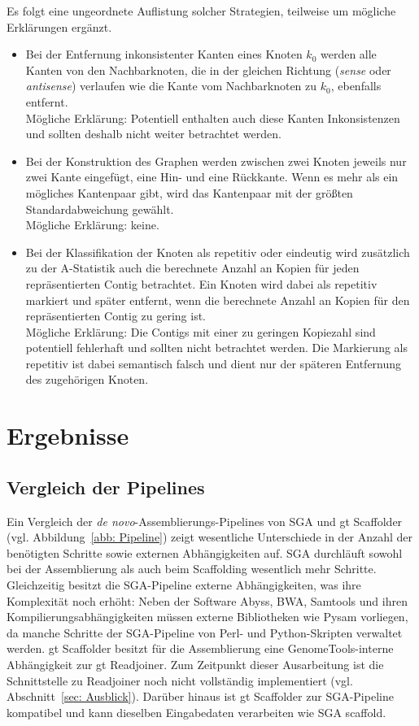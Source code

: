 \documentclass[a4paper,10pt,parskip]{scrartcl}
\begin{document}
Es folgt eine ungeordnete Auflistung solcher Strategien, teilweise um
mögliche Erklärungen ergänzt.
\begin{itemize}
\item Bei der Entfernung inkonsistenter Kanten eines Knoten $k_0$
  werden alle Kanten von den Nachbarknoten, die in der gleichen
  Richtung (\textit{sense} oder \textit{antisense}) verlaufen wie die
  Kante vom Nachbarknoten zu $k_0$, ebenfalls entfernt. \\
  Mögliche Erklärung: Potentiell enthalten auch diese Kanten
  Inkonsistenzen und sollten deshalb nicht weiter betrachtet werden.
\item Bei der Konstruktion des Graphen werden zwischen zwei Knoten
  jeweils nur zwei Kante eingefügt, eine Hin- und eine Rückkante.
  Wenn es mehr als ein mögliches Kantenpaar gibt, wird das Kantenpaar mit der
  größten Standardabweichung gewählt. \\
  Mögliche Erklärung: keine.
\item Bei der Klassifikation der Knoten als repetitiv oder eindeutig
  wird zusätzlich zu der A-Statistik auch die berechnete Anzahl an
  Kopien für jeden repräsentierten Contig betrachtet. Ein Knoten wird
  dabei als repetitiv markiert und später entfernt, wenn die
  berechnete Anzahl an Kopien für den repräsentierten Contig zu gering
  ist. \\
  Mögliche Erklärung: Die Contigs mit einer zu geringen
  Kopiezahl sind potentiell fehlerhaft und sollten nicht betrachtet
  werden. Die Markierung als repetitiv ist dabei semantisch falsch und
  dient nur der späteren Entfernung des zugehörigen Knoten.
\end{itemize}

\section{Ergebnisse}
\label{sec: Ergebnisse}
\subsection{Vergleich der Pipelines }

Ein Vergleich der \textit{de novo}-Assemblierungs-Pipelines von SGA und gt
Scaffolder (vgl. Abbildung~\ref{abb: Pipeline}) zeigt wesentliche Unterschiede
in der Anzahl der benötigten Schritte sowie externen Abhängigkeiten auf.
SGA durchläuft sowohl bei der Assemblierung als auch beim Scaffolding wesentlich
mehr Schritte. Gleichzeitig besitzt die SGA-Pipeline externe Abhängigkeiten,
was ihre Komplexität noch erhöht: Neben der Software Abyss, BWA, Samtools und
ihren Kompilierungsabhängigkeiten müssen externe Bibliotheken wie Pysam
vorliegen, da manche Schritte der SGA-Pipeline von Perl- und Python-Skripten
verwaltet werden.
gt Scaffolder besitzt für die Assemblierung eine GenomeTools-interne
Abhängigkeit zur gt Readjoiner. Zum Zeitpunkt dieser Ausarbeitung ist die
Schnittstelle zu Readjoiner noch nicht vollständig implementiert
(vgl. Abschnitt~\ref{sec: Ausblick}). Darüber hinaus ist gt Scaffolder zur
SGA-Pipeline kompatibel und kann dieselben Eingabedaten verarbeiten wie SGA
scaffold.
\end{document}
